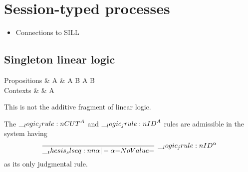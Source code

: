 \chapter{Session-typed processes}\label{ch:session-typed-procs}

\begin{itemize}
\item Connections to SILL
\end{itemize}

\section{Singleton linear logic}\label{sec:singleton-logic}

\begin{syntax*}
  Propositions &
    A & \alpha \mid A \plus B \mid \zero \mid A \with B \mid \top
  \\
  Contexts & \sctx & A
\end{syntax*}


This is not the additive fragment of linear logic.

\begin{theorem}
  The $\__logic_jrule:n {CUT}^A$ and $\__logic_jrule:n {ID}^A$ rules are admissible in the system having
  \begin{equation*}
    \infer[\normalfont\jrule{ID}^{\alpha}]{\slseq{\alpha |- \alpha}}{}
  \end{equation*}
  as its only judgmental rule.
\end{theorem}


